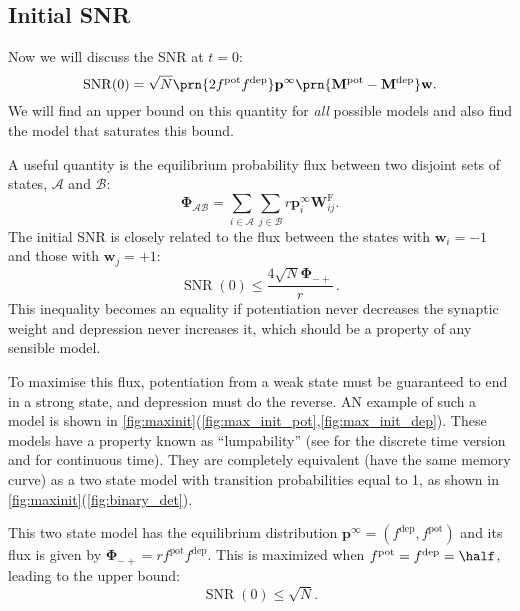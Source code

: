 \documentclass{article} %
\DeclareMathOperator{\snr}{SNR}
\newcommand{\pr}{\mathbf{p}}
\newcommand{\eq}{\pr^\infty}
\newcommand{\w}{\mathbf{w}}
\newcommand{\W}{\mathbf{W}}
\newcommand{\M}{\mathbf{M}}
\newcommand{\frg}{\W^{\mathrm{F}}}
\newcommand{\F}{\boldsymbol{\Phi}}
\newcommand{\pot}{^{\text{pot}}}
\newcommand{\dep}{^{\text{dep}}}
\newcommand{\CA}{\mathcal{A}}
\newcommand{\CB}{\mathcal{B}}
\begin{document}
\subsection{Initial SNR}\label{sec:initial}

Now we will discuss the SNR at $t=0$:
%
\begin{equation}\label{eq:init}
  \snr(0) = \sqrt{N}\prn{2 f\pot f\dep} \eq \prn{\M\pot-\M\dep} \w.
\end{equation}
%
We will find an upper bound on this quantity for \emph{all} possible models and also find the model that saturates this bound.

A useful quantity is the equilibrium probability flux between two disjoint sets of states, $\CA$ and $\CB$:
%
\begin{equation}\label{eq:flux}
  \F_{\CA\CB} = \sum_{i\in\CA} \sum_{j\in\CB} r \eq_i \frg_{ij}.
\end{equation}
%
The initial SNR is closely related to the flux between the states with $\w_i=-1$ and those with $\w_j=+1$:
%
\begin{equation}\label{eq:initflux}
  \snr(0) \leq \frac{4\sqrt{N}\F_{-+}}{r}\,.
\end{equation}
%
This inequality becomes an equality if potentiation never decreases the synaptic weight and depression never increases it, which should be a property of any sensible model.

To maximise this flux, potentiation from a weak state must be guaranteed to end in a strong state, and depression must do the reverse.
AN example of such a model is shown in \autoref{fig:maxinit}(\ref{fig:max_init_pot},\ref{fig:max_init_dep}).
These models have a property known as ``lumpability'' (see \cite[\S6.3]{kemeny1960finite} for the discrete time version and \cite{burke1958markovian,Ball1993Lumpability} for continuous time).
They are completely equivalent (\ie have the same memory curve) as a two state model with transition probabilities equal to 1, as shown in \autoref{fig:maxinit}(\ref{fig:binary_det}).

This two state model has the equilibrium distribution $\eq=(f\dep,f\pot)$ and its flux is given by $\F_{-+} = rf\pot f\dep$. 
This is maximized when $f\pot=f\dep=\half$, leading to the upper bound:
%
\begin{equation}\label{eq:maxinit}
  \snr(0) \leq \sqrt{N}.
\end{equation}
%
\end{document}
